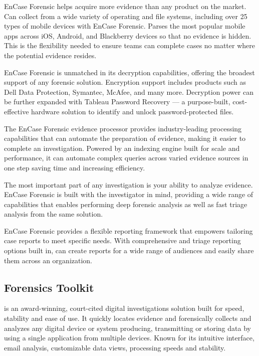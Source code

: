 EnCase Forensic helps acquire more evidence than any product on the market. Can collect from a wide variety of operating and file systems, 
including over 25 types of mobile devices with EnCase Forensic. Parses the most popular mobile apps across iOS, Android, and Blackberry devices so that 
no evidence is hidden. This is the flexibility needed to ensure teams can complete cases no matter where the potential evidence resides.

EnCase Forensic is unmatched in its decryption capabilities, offering the broadest support of any forensic solution. Encryption support includes products 
such as Dell Data Protection, Symantec, McAfee, and many more. Decryption power can be further expanded with Tableau Password 
Recovery — a purpose-built, cost-effective hardware solution to identify and unlock password-protected files. 

The EnCase Forensic evidence processor provides industry-leading processing capabilities that can automate the preparation of evidence, making 
it easier to complete an investigation. Powered by an indexing engine built for scale and performance, it can automate complex queries across 
varied evidence sources in one step saving time and increasing efficiency. 

The most important part of any investigation is your ability to analyze evidence. EnCase Forensic is built with the investigator in mind, 
providing a wide range of capabilities that enables performing deep forensic analysis as well as fast triage analysis from the same solution. 

EnCase Forensic provides a flexible reporting framework that empowers tailoring case reports to meet specific needs. With comprehensive 
and triage reporting options built in, can create reports for a wide range of audiences and easily share them across an organization. 

\subsection{Forensics Toolkit}

 \cite{ftk}  is an award-winning, court-cited digital investigations solution built for speed, stability and ease of use. It quickly 
locates evidence and forensically collects and analyzes any digital device or system producing, transmitting or 
storing data by using a single application from multiple devices. Known for its intuitive interface, email analysis, 
customizable data views, processing speeds and stability.


